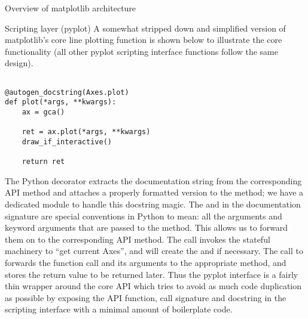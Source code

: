 \begin{aosasect1}{Overview of matplotlib architecture}
\begin{aosasect2}{Scripting layer (pyplot)}
A somewhat stripped down and simplified version of matplotlib's core
line plotting function  is shown below to
illustrate the core functionality (all other pyplot scripting
interface functions follow the same design).

\begin{verbatim}

@autogen_docstring(Axes.plot)
def plot(*args, **kwargs):
    ax = gca()

    ret = ax.plot(*args, **kwargs)
    draw_if_interactive()

    return ret

\end{verbatim}

The Python decorator  extracts
the documentation string from the corresponding API method and
attaches a properly formatted version to the 
method; we have a dedicated module  to
handle this docstring magic.  The  and  in
the documentation signature are special conventions in Python to mean:
all the arguments and keyword arguments that are passed to the method.
This allows us to forward them on to the corresponding API method.
The call  invokes the stateful machinery to ``get
current Axes'', and will create the  and  if
necessary.  The call to  forwards
the function call and its arguments to the appropriate 
method, and stores the return value to be returned later.  Thus the
pyplot interface is a fairly thin wrapper around the core
 API which tries to avoid as much code duplication as
possible by exposing the API function, call signature and docstring in
the scripting interface with a minimal amount of boilerplate code.


\end{aosasect2}


\end{aosasect1}


